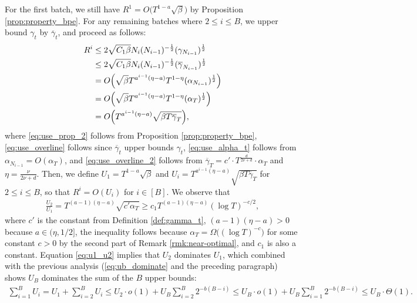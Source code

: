 \documentclass[10pt]{article}
\begin{document}
For the first batch, we still have $R^1 = O\bigl(T^{1-a} \sqrt{\beta}\bigr)$ by Proposition \ref{prop:property_bpe}. For any remaining batches where $2\leq i \leq B$, we upper bound $\gamma_t$ by $\overline{\gamma}_t$, and proceed as follows:
\begin{align}
    R^i
    & \leq 2\sqrt{C_1\beta} N_i(N_{i-1})^{-\frac{1}{2}}(\gamma_{N_{i-1}})^{\frac{1}{2}} \label{eq:use_prop_2} \\
    & \leq 2\sqrt{C_1\beta} N_i(N_{i-1})^{-\frac{1}{2}}(\overline{\gamma}_{N_{i-1}})^{\frac{1}{2}} \label{eq:use_overline} \\
    & = O\Bigl( \sqrt{\beta} T^{a^{i-1}(\eta-a)} T^{1-\eta} (\alpha_{N_{i-1}} )^{\frac{1}{2}} \Bigr) \\
    & = O\Bigl( \sqrt{\beta} T^{a^{i-1}(\eta-a)} T^{1-\eta} (\alpha_{T} )^{\frac{1}{2}} \Bigr) \label{eq:use_alpha_t} \\
    & = O\Bigl( T^{a^{i-1}(\eta-a)} \sqrt{\beta T\overline{\gamma}_T} \Bigr) \label{eq:use_overline_2},
\end{align}
where \eqref{eq:use_prop_2} follows from Proposition \ref{prop:property_bpe}, \eqref{eq:use_overline} follows since $\overline{\gamma}_t$ upper bounds $\gamma_t$,
\eqref{eq:use_alpha_t} follows from $\alpha_{N_{i-1}} = O(\alpha_T)$, and \eqref{eq:use_overline_2} follows from $\overline{\gamma}_T = c' \cdot T^{\frac{d}{2\nu+d}} \cdot\alpha_T$ and $\eta = \frac{\nu}{2\nu+d}$.
Then, we define $U_1 = T^{1-a} \sqrt{\beta}$ and $U_i = T^{a^{i-1}(\eta-a)} \sqrt{\beta T\overline{\gamma}_T}$ for $2\leq i\leq B$, so that $R^i=O(U_i)$ for $i\in[B]$. 
We observe that
\begin{align}
    \frac{U_{2}}{U_{1}}
    = T^{(a-1)(\eta-a)}\sqrt{c'\alpha_T}
    \geq c_1T^{(a-1)(\eta-a)}(\log T)^{-c/2}, \label{eq:u1_u2}
\end{align}
where $c'$ is the constant from Definition \ref{def:gamma_t}, $(a-1)(\eta-a) > 0$ because $a\in(\eta, 1/2]$, the inequality follows because $\alpha_T = \Omega\bigl((\log T)^{-c} \bigr)$ for some constant $c > 0$ by the second part of Remark \ref{rmk:near-optimal}, and $c_1$ is also a constant. 
Equation \eqref{eq:u1_u2} implies that $U_2$ dominates $U_1$, which combined with the previous analysis (\eqref{eq:ub_dominate} and the preceding paragraph) shows $U_B$ dominates the sum of the $B$ upper bounds:
\begin{align}
    \sum_{i=1}^B U_i 
    = U_1 + \sum_{i=2}^B U_i 
    \leq U_2\cdot o(1) + U_B \sum_{i=2}^B 2^{-b(B-i)}
    \leq U_B\cdot o(1) + U_B \sum_{i=1}^B 2^{-b(B-i)}
    \leq U_B \cdot \Theta(1). \label{eq:dominance_2}
\end{align}
\end{document}
